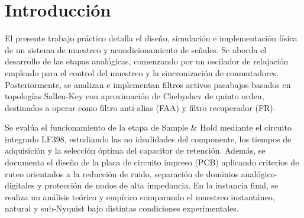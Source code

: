 \section{Introducción}

El presente trabajo práctico detalla el diseño, simulación e implementación física de un sistema de muestreo y acondicionamiento de señales. Se aborda el desarrollo de las etapas analógicas, comenzando por un oscilador de relajación empleado para el control del muestreo y la sincronización de conmutadores. Posteriormente, se analizan e implementan filtros activos pasabajos basados en topologías Sallen-Key con aproximación de Chebyshev de quinto orden, destinados a operar como filtro anti-alias (FAA) y filtro recuperador (FR).

Se evalúa el funcionamiento de la etapa de Sample \& Hold mediante el circuito integrado LF398, estudiando las no idealidades del componente, los tiempos de adquisición y la selección óptima del capacitor de retención. Además, se documenta el diseño de la placa de circuito impreso (PCB) aplicando criterios de ruteo orientados a la reducción de ruido, separación de dominios analógico-digitales y protección de nodos de alta impedancia. En la instancia final, se realiza un análisis teórico y empírico comparando el muestreo instantáneo, natural y sub-Nyquist bajo distintas condiciones experimentales.